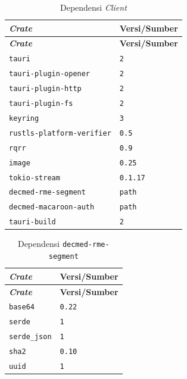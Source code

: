 \begin{longtable}{|>{\raggedright\arraybackslash}p{}|>{\raggedright\arraybackslash}p{}|}
	\caption{Dependensi \textit{Client}}
	\label{tab:dependensi-client-tauri}                       \\
	\hline
	\textbf{\textit{Crate}}           & \textbf{Versi/Sumber} \\
	\hline
	\endfirsthead
	\hline
	\textbf{\textit{Crate}}           & \textbf{Versi/Sumber} \\
	\hline
	\endhead

	\texttt{tauri}                    & \texttt{2}            \\ \hline
	\texttt{tauri-plugin-opener}      & \texttt{2}            \\ \hline
	\texttt{tauri-plugin-http}        & \texttt{2}            \\ \hline
	\texttt{tauri-plugin-fs}          & \texttt{2}            \\ \hline
	\texttt{keyring}                  & \texttt{3}            \\ \hline
	\texttt{rustls-platform-verifier} & \texttt{0.5}          \\ \hline
	\texttt{rqrr}                     & \texttt{0.9}          \\ \hline
	\texttt{image}                    & \texttt{0.25}         \\ \hline
	\texttt{tokio-stream}             & \texttt{0.1.17}       \\ \hline
	\texttt{decmed-rme-segment}       & \texttt{path}         \\ \hline
	\texttt{decmed-macaroon-auth}     & \texttt{path}         \\ \hline
	\texttt{tauri-build}              & \texttt{2}            \\ \hline
\end{longtable}

\begin{longtable}{|>{\raggedright\arraybackslash}p{}|>{\raggedright\arraybackslash}p{}|}
	\caption{Dependensi \texttt{decmed-rme-segment}}
	\label{tab:dependensi-decmed-rme-segment}       \\
	\hline
	\textbf{\textit{Crate}} & \textbf{Versi/Sumber} \\
	\hline
	\endfirsthead
	\hline
	\textbf{\textit{Crate}} & \textbf{Versi/Sumber} \\
	\hline
	\endhead

	\texttt{base64}         & \texttt{0.22}         \\ \hline
	\texttt{serde}          & \texttt{1}            \\ \hline
	\texttt{serde\_json}    & \texttt{1}            \\ \hline
	\texttt{sha2}           & \texttt{0.10}         \\ \hline
	\texttt{uuid}           & \texttt{1}            \\ \hline
\end{longtable}

